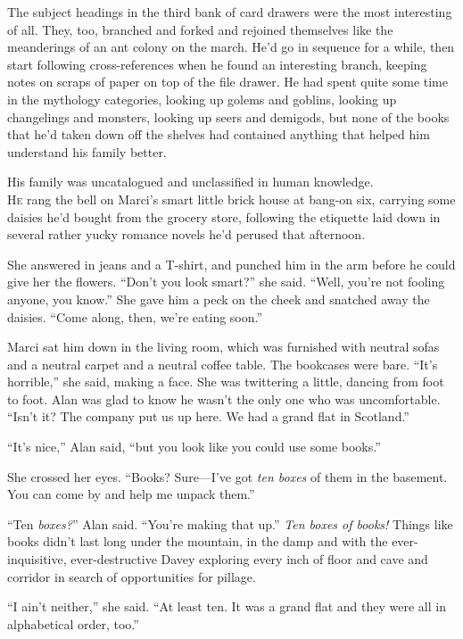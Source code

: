 \documentclass{article}
\begin{document}
The subject headings in the third bank of card drawers were the most
interesting of all.  They, too, branched and forked and rejoined
themselves like the meanderings of an ant colony on the march.  He'd
go in sequence for a while, then start following cross-references when
he found an interesting branch, keeping notes on scraps of paper on
top of the file drawer.  He had spent quite some time in the mythology
categories, looking up golems and goblins, looking up changelings and
monsters, looking up seers and demigods, but none of the books that
he'd taken down off the shelves had contained anything that helped him
understand his family better.

His family was uncatalogued and unclassified in human knowledge.
\\
\lettrine[lines=3, lhang=.5, nindent=0pt, findent=2pt]{H}{e} rang the bell on Marci's smart little brick house at bang-on six,
carrying some daisies he'd bought from the grocery store, following
the etiquette laid down in several rather yucky romance novels he'd
perused that afternoon.

She answered in jeans and a T-shirt, and punched him in the arm before
he could give her the flowers.  ``Don't you look smart?'' she said. 
``Well, you're not fooling anyone, you know.'' She gave him a peck on
the cheek and snatched away the daisies.  ``Come along, then, we're
eating soon.''

Marci sat him down in the living room, which was furnished with
neutral sofas and a neutral carpet and a neutral coffee table.  The
bookcases were bare.  ``It's horrible,'' she said, making a face.  She
was twittering a little, dancing from foot to foot.  Alan was glad to
know he wasn't the only one who was uncomfortable.  ``Isn't it?  The
company put us up here.  We had a grand flat in Scotland.''

``It's nice,'' Alan said, ``but you look like you could use some
books.''

She crossed her eyes.  ``Books?  Sure---I've got \textit{ten boxes} of
them in the basement.  You can come by and help me unpack them.''

``Ten \textit{boxes?}'' Alan said.  ``You're making that up.''
\textit{Ten boxes of books!} Things like books didn't last long under
the mountain, in the damp and with the ever-inquisitive,
ever-destructive Davey exploring every inch of floor and cave and
corridor in search of opportunities for pillage.

``I ain't neither,'' she said.  ``At least ten.  It was a grand flat
and they were all in alphabetical order, too.''
\end{document}
